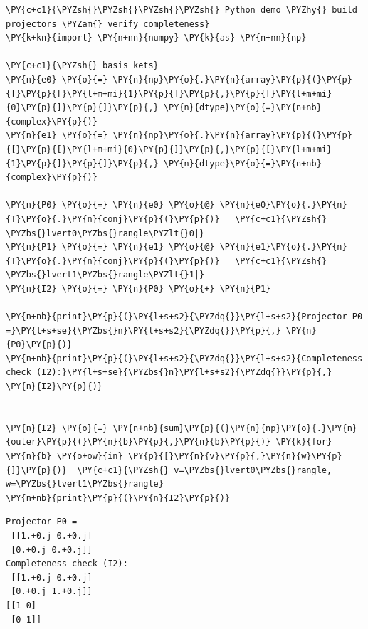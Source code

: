     \begin{tcolorbox}[breakable, size=fbox, boxrule=1pt, pad at break*=1mm,colback=cellbackground, colframe=cellborder]
\begin{Verbatim}[commandchars=\\\{\}]
\PY{c+c1}{\PYZsh{}\PYZsh{}\PYZsh{}\PYZsh{} Python demo \PYZhy{} build projectors \PYZam{} verify completeness}
\PY{k+kn}{import} \PY{n+nn}{numpy} \PY{k}{as} \PY{n+nn}{np}

\PY{c+c1}{\PYZsh{} basis kets}
\PY{n}{e0} \PY{o}{=} \PY{n}{np}\PY{o}{.}\PY{n}{array}\PY{p}{(}\PY{p}{[}\PY{p}{[}\PY{l+m+mi}{1}\PY{p}{]}\PY{p}{,}\PY{p}{[}\PY{l+m+mi}{0}\PY{p}{]}\PY{p}{]}\PY{p}{,} \PY{n}{dtype}\PY{o}{=}\PY{n+nb}{complex}\PY{p}{)}
\PY{n}{e1} \PY{o}{=} \PY{n}{np}\PY{o}{.}\PY{n}{array}\PY{p}{(}\PY{p}{[}\PY{p}{[}\PY{l+m+mi}{0}\PY{p}{]}\PY{p}{,}\PY{p}{[}\PY{l+m+mi}{1}\PY{p}{]}\PY{p}{]}\PY{p}{,} \PY{n}{dtype}\PY{o}{=}\PY{n+nb}{complex}\PY{p}{)}

\PY{n}{P0} \PY{o}{=} \PY{n}{e0} \PY{o}{@} \PY{n}{e0}\PY{o}{.}\PY{n}{T}\PY{o}{.}\PY{n}{conj}\PY{p}{(}\PY{p}{)}   \PY{c+c1}{\PYZsh{} \PYZbs{}lvert0\PYZbs{}rangle\PYZlt{}0|}
\PY{n}{P1} \PY{o}{=} \PY{n}{e1} \PY{o}{@} \PY{n}{e1}\PY{o}{.}\PY{n}{T}\PY{o}{.}\PY{n}{conj}\PY{p}{(}\PY{p}{)}   \PY{c+c1}{\PYZsh{} \PYZbs{}lvert1\PYZbs{}rangle\PYZlt{}1|}
\PY{n}{I2} \PY{o}{=} \PY{n}{P0} \PY{o}{+} \PY{n}{P1}

\PY{n+nb}{print}\PY{p}{(}\PY{l+s+s2}{\PYZdq{}}\PY{l+s+s2}{Projector P0 =}\PY{l+s+se}{\PYZbs{}n}\PY{l+s+s2}{\PYZdq{}}\PY{p}{,} \PY{n}{P0}\PY{p}{)}
\PY{n+nb}{print}\PY{p}{(}\PY{l+s+s2}{\PYZdq{}}\PY{l+s+s2}{Completeness check (I2):}\PY{l+s+se}{\PYZbs{}n}\PY{l+s+s2}{\PYZdq{}}\PY{p}{,} \PY{n}{I2}\PY{p}{)}


\PY{n}{I2} \PY{o}{=} \PY{n+nb}{sum}\PY{p}{(}\PY{n}{np}\PY{o}{.}\PY{n}{outer}\PY{p}{(}\PY{n}{b}\PY{p}{,}\PY{n}{b}\PY{p}{)} \PY{k}{for} \PY{n}{b} \PY{o+ow}{in} \PY{p}{[}\PY{n}{v}\PY{p}{,}\PY{n}{w}\PY{p}{]}\PY{p}{)}  \PY{c+c1}{\PYZsh{} v=\PYZbs{}lvert0\PYZbs{}rangle, w=\PYZbs{}lvert1\PYZbs{}rangle}
\PY{n+nb}{print}\PY{p}{(}\PY{n}{I2}\PY{p}{)}
\end{Verbatim}
\end{tcolorbox}

    \begin{Verbatim}[commandchars=\\\{\}]
Projector P0 =
 [[1.+0.j 0.+0.j]
 [0.+0.j 0.+0.j]]
Completeness check (I2):
 [[1.+0.j 0.+0.j]
 [0.+0.j 1.+0.j]]
[[1 0]
 [0 1]]
    \end{Verbatim}

